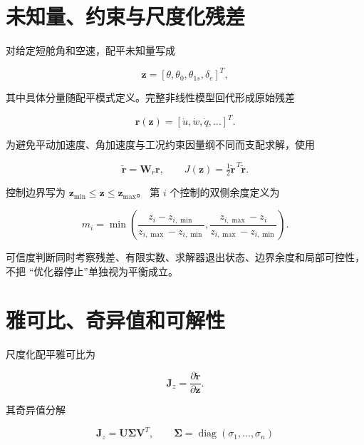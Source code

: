 \documentclass[UTF8,12pt,oneside,openany,fontset=windows]{ctexbook}
\begin{document}
\section{未知量、约束与尺度化残差}

对给定短舱角和空速，配平未知量写成

\begin{equation}
\mathbf z=[\theta,\theta_0,\theta_{1s},\delta_e]^T,
\end{equation}

其中具体分量随配平模式定义。完整非线性模型回代形成原始残差

\begin{equation}
\mathbf r(\mathbf z)=[\dot u,\dot w,\dot q,\ldots]^T .
\end{equation}

为避免平动加速度、角加速度与工况约束因量纲不同而支配求解，使用

\begin{equation}
\widetilde{\mathbf r}=\mathbf W_r\mathbf r,\qquad
J(\mathbf z)=\tfrac12\widetilde{\mathbf r}^{\,T}\widetilde{\mathbf r}.
\end{equation}

控制边界写为 \(\mathbf z_{\min}\le\mathbf z\le\mathbf z_{\max}\)。 第 \(i\) 个控制的双侧余度定义为

\begin{equation}
m_i=\min\left(\frac{z_i-z_{i,\min}}{z_{i,\max}-z_{i,\min}},
\frac{z_{i,\max}-z_i}{z_{i,\max}-z_{i,\min}}\right).
\end{equation}

可信度判断同时考察残差、有限实数、求解器退出状态、边界余度和局部可控性，不把 “优化器停止”单独视为平衡成立。

\section{雅可比、奇异值和可解性}

尺度化配平雅可比为

\begin{equation}
\mathbf J_z=\frac{\partial\widetilde{\mathbf r}}{\partial\mathbf z}.
\end{equation}

其奇异值分解

\begin{equation}
\mathbf J_z=\mathbf U\boldsymbol\Sigma\mathbf V^T,\qquad
\boldsymbol\Sigma=\operatorname{diag}(\sigma_1,\ldots,\sigma_n)
\end{equation}
\end{document}
